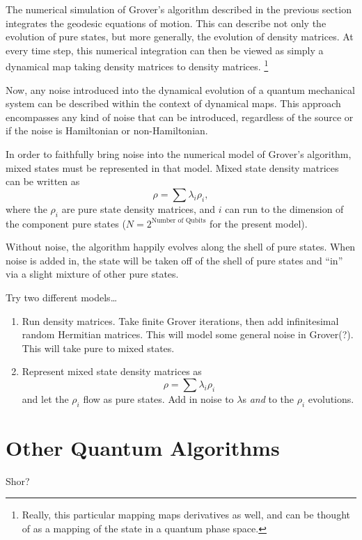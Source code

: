 The numerical simulation of Grover's algorithm described 
in the previous section integrates the geodesic equations 
of motion.  This can describe not only the evolution of pure states, 
but more generally, the evolution of density matrices.  
At every time step,
this numerical integration can then be viewed as simply a dynamical
map taking density matrices to density matrices.
\footnote{Really, this particular mapping maps derivatives as well, and
can be thought of as a mapping of the state in a quantum phase 
space.}

Now, any noise introduced into the dynamical evolution of a 
quantum mechanical system can be described within the context 
of dynamical maps.   This approach encompasses any kind of noise
that can be introduced, regardless of the source or if the noise
is Hamiltonian or non-Hamiltonian.

In order to faithfully bring noise into the numerical model of Grover's 
algorithm, mixed states must be represented in that model.  
Mixed state density matrices can be written as
\begin{equation}
\rho = \sum\lambda_i\rho_i,
\end{equation}
where the $\rho_i$ are pure state density matrices, and $i$ can run 
to the dimension of the component pure 
states ($N=2^{\text{Number of Qubits}}$ for the present model). 

Without noise,
the algorithm happily evolves along the shell of pure states.
When noise is added in, the state will be taken off of the shell 
of pure states and ``in'' via a slight mixture of other pure states.

Try two different models\dots
\begin{enumerate}
\item Run density matrices.  Take finite Grover iterations, then add
infinitesimal random Hermitian matrices.  This will model some general
noise in Grover(?). This will take pure to mixed states.
\item Represent mixed state density matrices as
\begin{equation}
\rho = \sum\lambda_i\rho_i
\end{equation}
and let the $\rho_i$ flow as pure states.  Add in noise to $\lambda$s
{\sl and} to the $\rho_i$ evolutions.
\end{enumerate}


\section{Other Quantum Algorithms}

Shor?
